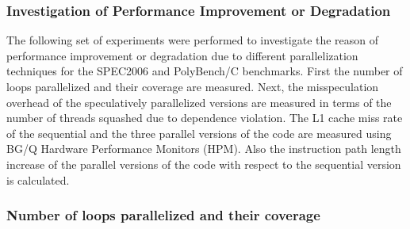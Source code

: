 \documentclass[10pt]{report}          %
\begin{document}
\subsubsection{Investigation of Performance Improvement or Degradation}

The following set of experiments were performed to investigate the reason of performance improvement or degradation due to different parallelization techniques for the SPEC2006 and PolyBench/C benchmarks.  First the number of loops parallelized and their coverage are measured.  Next, the misspeculation overhead of the speculatively parallelized versions are measured in terms of the number of threads squashed due to dependence violation. The L1 cache miss rate of the sequential and the three parallel versions of the code are measured using BG/Q Hardware Performance Monitors (HPM).  Also the instruction path length increase of the parallel versions of the code with respect to the sequential version is calculated.

\subsubsection{Number of loops parallelized and their coverage}
\end{document}

